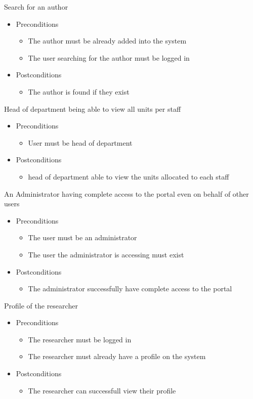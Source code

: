 \documentclass[a4paper,12pt]{article}
\begin{document}
Search for an author
\begin{itemize}
    \item Preconditions
    \begin{itemize}
        \item The author must be already added into the system
        \item The user searching for the author must be logged in
    \end{itemize}
    \item Postconditions
    \begin{itemize}
        \item The author is found if they exist
    \end{itemize}
\end{itemize}
Head of department being able to view all units per staff
\begin{itemize}
    \item Preconditions
    \begin{itemize}
        \item User must be head of department
    \end{itemize}
    \item Postconditions
    \begin{itemize}
        \item head of department able to view the units allocated to each staff
    \end{itemize}
\end{itemize}
An Administrator having complete access to the portal even on behalf of other users
\begin{itemize}
    \item Preconditions
    \begin{itemize}
        \item The user must be an administrator
        \item The user the administrator is accessing must exist
    \end{itemize}
    \item Postconditions
    \begin{itemize}
        \item The administrator successfully have complete access to the portal
    \end{itemize}
\end{itemize}
Profile of the researcher
\begin{itemize}
    \item Preconditions
    \begin{itemize}
        \item The researcher must be logged in
        \item The researcher must already have a profile on the system
    \end{itemize}
    \item Postconditions
    \begin{itemize}
        \item The researcher can successfull view their profile
    \end{itemize}
\end{itemize}
\end{document}
